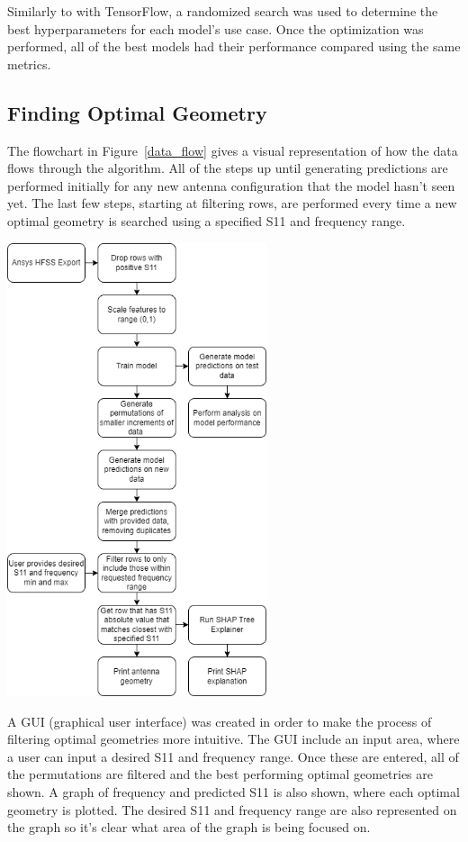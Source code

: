\documentclass[lettersize,journal]{IEEEtran}
\newenvironment{Figure}
    {\par\medskip\noindent\minipage{\linewidth}}
    {\endminipage\par\medskip}
\begin{document}
Similarly to with TensorFlow, a randomized search was used to determine the best hyperparameters for each model's use case. Once the optimization was performed, all of the best models had their performance compared using the same metrics. 

\subsection{Finding Optimal Geometry}
The flowchart in Figure~\ref{data_flow} gives a visual representation of how the data flows through the algorithm. All of the steps up until generating predictions are performed initially for any new antenna configuration that the model hasn't seen yet. The last few steps, starting at filtering rows, are performed every time a new optimal geometry is searched using a specified S11 and frequency range. 

\begin{Figure}
\centering
\includegraphics[width=3.0in]{methodology}
\label{data_flow}
\end{Figure}

A GUI (graphical user interface) was created in order to make the process of filtering optimal geometries more intuitive. The GUI include an input area, where a user can input a desired S11 and frequency range. Once these are entered, all of the permutations are filtered and the best performing optimal geometries are shown. A graph of frequency and predicted S11 is also shown, where each optimal geometry is plotted. The desired S11 and frequency range are also represented on the graph so it's clear what area of the graph is being focused on.
\end{document}

